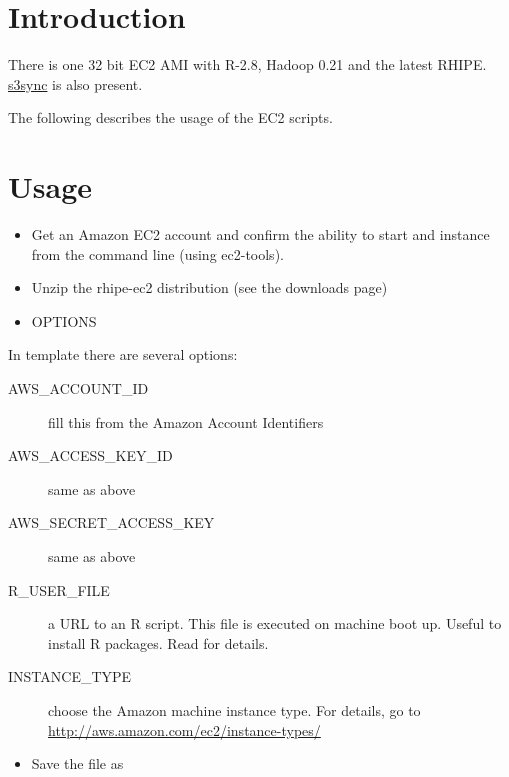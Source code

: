 \documentclass[letterpaper,10pt,english]{manual}
\begin{document}
\section{Introduction}

There is one 32 bit EC2 AMI with R-2.8, Hadoop 0.21 and the latest RHIPE. \href{http://s3sync.net/wiki}{s3sync} is also present.

The following describes the usage of the EC2 scripts.


\section{Usage}
\begin{itemize}
\item {} 
Get an Amazon EC2 account and confirm the ability to start and instance from the command line (using ec2-tools).

\item {} 
Unzip the rhipe-ec2 distribution (see the downloads page)

\item {} 
OPTIONS

\end{itemize}

In  template there are several options:
\begin{description}
\item[AWS\_ACCOUNT\_ID]
fill this from the Amazon Account Identifiers

\item[AWS\_ACCESS\_KEY\_ID]
same as above

\item[AWS\_SECRET\_ACCESS\_KEY]
same as above

\item[R\_USER\_FILE]
a URL to an R script. This file is executed on machine boot up. Useful to install R packages. Read  for details.

\item[INSTANCE\_TYPE]
choose the Amazon machine instance type. For details, go to
\href{http://aws.amazon.com/ec2/instance-types/}{http://aws.amazon.com/ec2/instance-types/}

\end{description}
\begin{itemize}
\item {} 
Save the file as 

\end{itemize}
\end{document}
